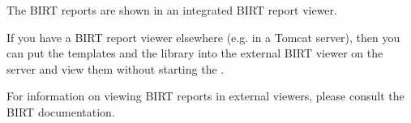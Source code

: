 The BIRT reports are shown in an integrated BIRT report viewer. 

If you have a BIRT report viewer elsewhere (e.g. in a Tomcat server), then you can put the templates and the library into the external BIRT viewer on the server and view them without starting the \ite{}. 

For information on viewing BIRT reports in external viewers, please consult the BIRT documentation.  
